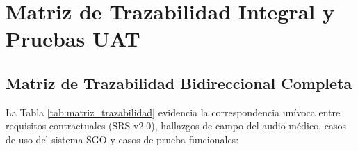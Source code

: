 \documentclass[12pt,a4paper]{report}
\begin{document}
\newpage
\chapter{Matriz de Trazabilidad Integral y Pruebas UAT}

\section{Matriz de Trazabilidad Bidireccional Completa}
La Tabla \ref{tab:matriz_trazabilidad} evidencia la correspondencia unívoca entre requisitos contractuales (SRS v2.0), hallazgos de campo del audio médico, casos de uso del sistema SGO y casos de prueba funcionales:
\end{document}
